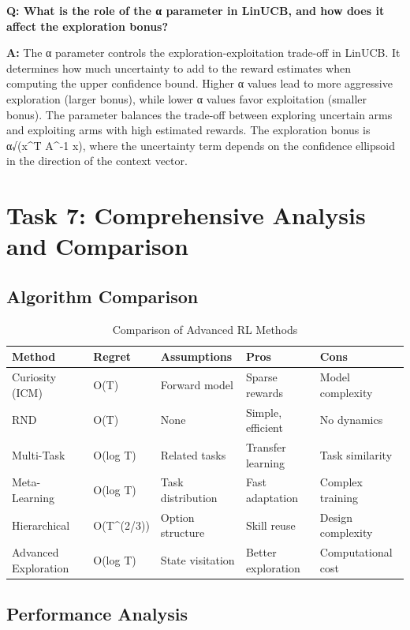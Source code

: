 \documentclass[12pt]{article}
\begin{document}
{{{\textbf{Q: What is the role of the α parameter in LinUCB, and how does it affect the exploration bonus?}

\textbf{A:} The α parameter controls the exploration-exploitation trade-off in LinUCB. It determines how much uncertainty to add to the reward estimates when computing the upper confidence bound. Higher α values lead to more aggressive exploration (larger bonus), while lower α values favor exploitation (smaller bonus). The parameter balances the trade-off between exploring uncertain arms and exploiting arms with high estimated rewards. The exploration bonus is α√(x^T A^{-1} x), where the uncertainty term depends on the confidence ellipsoid in the direction of the context vector.

\section{Task 7: Comprehensive Analysis and Comparison}

\subsection{Algorithm Comparison}

\begin{table}[h]
\centering
\begin{tabular}{|l|l|l|l|l|}
\hline
\textbf{Method} & \textbf{Regret} & \textbf{Assumptions} & \textbf{Pros} & \textbf{Cons} \\
\hline
Curiosity (ICM) & O(T) & Forward model & Sparse rewards & Model complexity \\
RND & O(T) & None & Simple, efficient & No dynamics \\
Multi-Task & O(log T) & Related tasks & Transfer learning & Task similarity \\
Meta-Learning & O(log T) & Task distribution & Fast adaptation & Complex training \\
Hierarchical & O(T^(2/3)) & Option structure & Skill reuse & Design complexity \\
Advanced Exploration & O(log T) & State visitation & Better exploration & Computational cost \\
\hline
\end{tabular}
\caption{Comparison of Advanced RL Methods}
\end{table}

\subsection{Performance Analysis}

}}}
\end{document}
